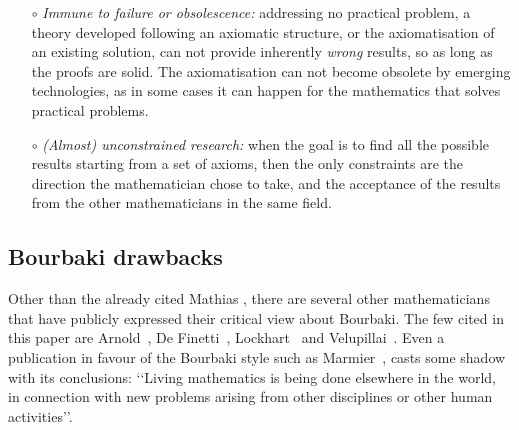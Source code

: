 \documentclass[]{scrartcl}
\theoremstyle{definition}
\begin{document}
\begin{itemize}
    \item[$\circ$] \emph{Immune to failure or obsolescence:} addressing no practical problem, a theory developed following an axiomatic structure, or the axiomatisation of an existing solution, can not provide inherently \emph{wrong} results, so as long as the proofs are solid. The axiomatisation can not become obsolete by emerging technologies, as in some cases it can happen for the mathematics that solves practical problems.
    
    \item[$\circ$] \emph{(Almost) unconstrained research:} when the goal is to find all the possible results starting from a set of axioms, then the only constraints are the direction the mathematician chose to take, and the acceptance of the results from the other mathematicians in the same field.
     
\end{itemize}

\subsection*{Bourbaki drawbacks}

Other than the already cited Mathias \cite{mathias1992ignorance}, there are several other mathematicians that have publicly expressed their critical view about Bourbaki. The few cited in this paper are Arnold~\cite{arnol1998teaching}, De Finetti~\cite{de2008bruno}, Lockhart~\cite{lockhart2009mathematician} and Velupillai~\cite{velupillai2012bourbaki}. Even a publication in favour of the Bourbaki style such as Marmier~\cite{marmier2014idea}, casts some shadow with its conclusions: \lq\lq Living mathematics is being done elsewhere in the world, in connection with new problems arising from other disciplines or other human activities\rq\rq.
\end{document}

